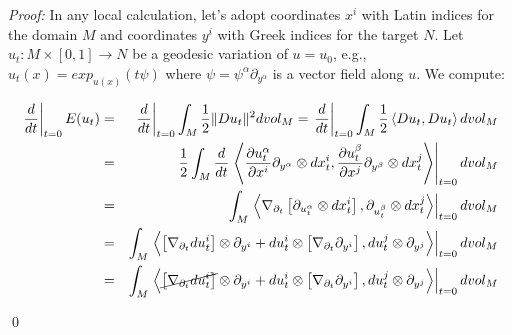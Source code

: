 \documentclass{article}
\newcommand{\proven}[0]{\begin{flushright} \qed \end{flushright}}
\begin{document}
\newline

{\em Proof:} In any local calculation, let's adopt coordinates $x^i$ with Latin indices for the domain $M$ and coordinates $y^i$ with Greek indices for the target $N$. Let $u_t: M \times [0,1] \rightarrow N$ be a geodesic variation of $u = u _0$, e.g., $u _t (x) = exp_{u (x)} (t \psi)$ where $\psi = \psi ^{\alpha} \partial _{y^\alpha}$ is a vector field along $u$. We compute:

\begin{eqnarray*}
\left. \frac{d}{dt} \right|_{t=0} E(u _t) & = & \displaystyle{\left. \frac{d}{dt} \right|_{t=0} \int _M \frac{1}{2} \|Du_t\|^2 dvol_M } = \displaystyle{\left.\frac{d}{dt} \right|_{t=0} \int _M \frac{1}{2}  \left\langle Du_t, Du_t \right\rangle dvol_M } \\
& = & \displaystyle{\frac{1}{2}  \int _M \frac{d}{dt} \left. \left\langle \frac{\partial u_t^{\alpha}}{\partial x ^i} \partial _{y^\alpha}\otimes dx ^i _t  , \frac{\partial u_t^{\beta}}{\partial x ^j} \partial _{y^\beta}\otimes dx ^j _t\right\rangle \right|_{t=0} dvol_M } \\
& = & \displaystyle{\int _M \left. \left\langle \nabla _{\partial _t} \left[ \partial _{u_t^{\alpha}}\otimes dx ^i _t \right], \partial _{u_t^{\beta}}\otimes dx ^j _t\right\rangle \right|_{t=0} dvol_M }\\
& = & \displaystyle{\int _M \left. \left\langle \left[\nabla _{\partial _t} du ^i _t \right]\otimes \partial _{y^i} + du ^i _t \otimes \left[ \nabla_ {\partial_t} \partial _{y^i}\right] , du ^j _t \otimes \partial _{y^j} \right\rangle \right|_{t=0} dvol_M } \\
& = & \displaystyle{\int _M  \left. \left\langle \cancel{\left[\nabla _{\partial _t} du ^i _t \right]}\otimes \partial _{y^i} + du ^i _t \otimes \left[ \nabla_ {\partial_t} \partial _{y^i}\right] , du ^j _t \otimes \partial _{y^j} \right\rangle \right|_{t=0} dvol_M } \\
\end{eqnarray*}

\proven
\end{document}
